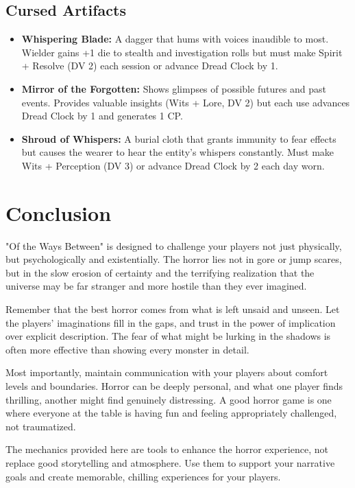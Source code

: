\documentclass[11pt]{article}
\begin{document}
\subsection{Cursed Artifacts}

\begin{itemize}
\item \textbf{Whispering Blade:} A dagger that hums with voices inaudible to most. Wielder gains +1 die to stealth and investigation rolls but must make Spirit + Resolve (DV 2) each session or advance Dread Clock by 1.
\item \textbf{Mirror of the Forgotten:} Shows glimpses of possible futures and past events. Provides valuable insights (Wits + Lore, DV 2) but each use advances Dread Clock by 1 and generates 1 CP.
\item \textbf{Shroud of Whispers:} A burial cloth that grants immunity to fear effects but causes the wearer to hear the entity's whispers constantly. Must make Wits + Perception (DV 3) or advance Dread Clock by 2 each day worn.
\end{itemize}

\section{Conclusion}

"Of the Ways Between" is designed to challenge your players not just physically, but psychologically and existentially. The horror lies not in gore or jump scares, but in the slow erosion of certainty and the terrifying realization that the universe may be far stranger and more hostile than they ever imagined.

Remember that the best horror comes from what is left unsaid and unseen. Let the players' imaginations fill in the gaps, and trust in the power of implication over explicit description. The fear of what might be lurking in the shadows is often more effective than showing every monster in detail.

Most importantly, maintain communication with your players about comfort levels and boundaries. Horror can be deeply personal, and what one player finds thrilling, another might find genuinely distressing. A good horror game is one where everyone at the table is having fun and feeling appropriately challenged, not traumatized.

The mechanics provided here are tools to enhance the horror experience, not replace good storytelling and atmosphere. Use them to support your narrative goals and create memorable, chilling experiences for your players.
\end{document}
